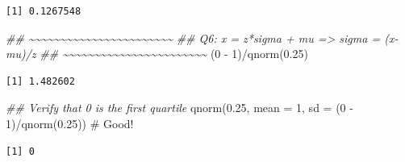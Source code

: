 \documentclass[
  letterpaper,
  DIV=11,
  numbers=noendperiod,
  oneside]{scrreprt}
\newenvironment{Shaded}{\begin{snugshade}}{\end{snugshade}}
\newcommand{\AttributeTok}[1]{\textcolor[rgb]{0.40,0.45,0.13}{#1}}
\newcommand{\CommentTok}[1]{\textcolor[rgb]{0.37,0.37,0.37}{#1}}
\newcommand{\DecValTok}[1]{\textcolor[rgb]{0.68,0.00,0.00}{#1}}
\newcommand{\DocumentationTok}[1]{\textcolor[rgb]{0.37,0.37,0.37}{\textit{#1}}}
\newcommand{\FloatTok}[1]{\textcolor[rgb]{0.68,0.00,0.00}{#1}}
\newcommand{\FunctionTok}[1]{\textcolor[rgb]{0.28,0.35,0.67}{#1}}
\newcommand{\NormalTok}[1]{\textcolor[rgb]{0.00,0.23,0.31}{#1}}
\newcommand{\SpecialCharTok}[1]{\textcolor[rgb]{0.37,0.37,0.37}{#1}}
\begin{document}
\begin{verbatim}
[1] 0.1267548
\end{verbatim}

\begin{Shaded}
\begin{Highlighting}[]
\DocumentationTok{\#\# \textasciitilde{}\textasciitilde{}\textasciitilde{}\textasciitilde{}\textasciitilde{}\textasciitilde{}\textasciitilde{}\textasciitilde{}\textasciitilde{}\textasciitilde{}\textasciitilde{}\textasciitilde{}\textasciitilde{}\textasciitilde{}\textasciitilde{}\textasciitilde{}\textasciitilde{}\textasciitilde{}\textasciitilde{}\textasciitilde{}\textasciitilde{}\textasciitilde{}\textasciitilde{}}
\DocumentationTok{\#\# Q6: x = z*sigma + mu =\textgreater{} sigma = (x{-}mu)/z}
\DocumentationTok{\#\# \textasciitilde{}\textasciitilde{}\textasciitilde{}\textasciitilde{}\textasciitilde{}\textasciitilde{}\textasciitilde{}\textasciitilde{}\textasciitilde{}\textasciitilde{}\textasciitilde{}\textasciitilde{}\textasciitilde{}\textasciitilde{}\textasciitilde{}\textasciitilde{}\textasciitilde{}\textasciitilde{}\textasciitilde{}\textasciitilde{}\textasciitilde{}\textasciitilde{}\textasciitilde{}}
\NormalTok{(}\DecValTok{0} \SpecialCharTok{{-}} \DecValTok{1}\NormalTok{)}\SpecialCharTok{/}\FunctionTok{qnorm}\NormalTok{(}\FloatTok{0.25}\NormalTok{)}
\end{Highlighting}
\end{Shaded}

\begin{verbatim}
[1] 1.482602
\end{verbatim}

\begin{Shaded}
\begin{Highlighting}[]
\DocumentationTok{\#\# Verify that 0 is the first quartile}
\FunctionTok{qnorm}\NormalTok{(}\FloatTok{0.25}\NormalTok{, }\AttributeTok{mean =} \DecValTok{1}\NormalTok{, }\AttributeTok{sd =}\NormalTok{ (}\DecValTok{0} \SpecialCharTok{{-}} \DecValTok{1}\NormalTok{)}\SpecialCharTok{/}\FunctionTok{qnorm}\NormalTok{(}\FloatTok{0.25}\NormalTok{)) }\CommentTok{\# Good!}
\end{Highlighting}
\end{Shaded}

\begin{verbatim}
[1] 0
\end{verbatim}
\end{document}

